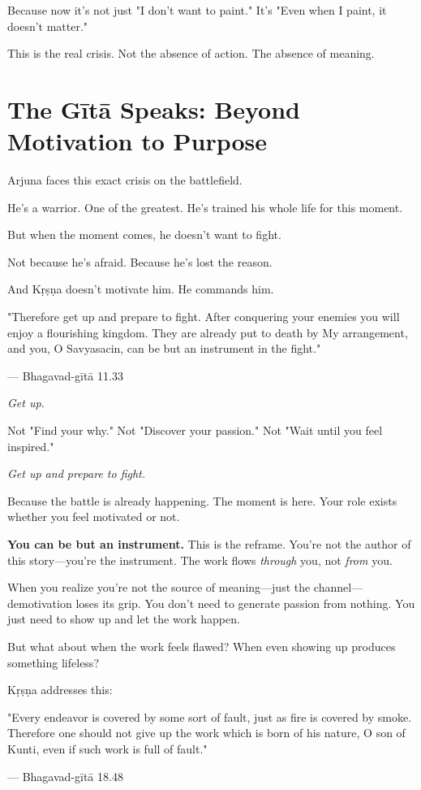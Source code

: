\documentclass[11pt,twoside]{book}
\begin{document}
Because now it's not just "I don't want to paint." It's "Even when I paint, it doesn't matter."

This is the real crisis. Not the absence of action. The absence of meaning.

\section*{The Gītā Speaks: Beyond Motivation to Purpose}

Arjuna faces this exact crisis on the battlefield.

He's a warrior. One of the greatest. He's trained his whole life for this moment.

But when the moment comes, he doesn't want to fight.

Not because he's afraid. Because he's lost the reason.

And Kṛṣṇa doesn't motivate him. He commands him.

\begin{pullquote}
"Therefore get up and prepare to fight. After conquering your enemies you will enjoy a flourishing kingdom. They are already put to death by My arrangement, and you, O Savyasacin, can be but an instrument in the fight."

--- Bhagavad-gītā 11.33
\end{pullquote}

\emph{Get up.}

Not "Find your why." Not "Discover your passion." Not "Wait until you feel inspired."

\emph{Get up and prepare to fight.}

Because the battle is already happening. The moment is here. Your role exists whether you feel motivated or not.

\textbf{\textbf{You can be but an instrument.}} This is the reframe. You're not the author of this story—you're the instrument. The work flows \emph{through} you, not \emph{from} you.

When you realize you're not the source of meaning—just the channel—demotivation loses its grip. You don't need to generate passion from nothing. You just need to show up and let the work happen.

But what about when the work feels flawed? When even showing up produces something lifeless?

Kṛṣṇa addresses this:

\begin{pullquote}
"Every endeavor is covered by some sort of fault, just as fire is covered by smoke. Therefore one should not give up the work which is born of his nature, O son of Kunti, even if such work is full of fault."

--- Bhagavad-gītā 18.48
\end{pullquote}
\end{document}

